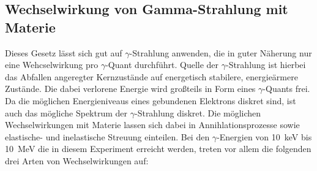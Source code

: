\subsection{Wechselwirkung von Gamma-Strahlung mit Materie}
Dieses Gesetz lässt sich gut auf $\gamma$-Strahlung anwenden, die in guter Näherung
nur eine Wehcselwirkung pro $\gamma$-Quant durchführt. Quelle der $\gamma$-Strahlung ist
hierbei das Abfallen angeregter Kernzustände auf energetisch stabilere, energieärmere
Zustände. Die dabei verlorene Energie wird großteils in Form eines $\gamma$-Quants frei.
Da die möglichen Energieniveaus eines gebundenen Elektrons diskret sind, ist auch das
mögliche Spektrum der $\gamma$-Strahlung diskret. Die möglichen Wechselwirkungen mit Materie
lassen sich dabei in Annihlationsprozesse sowie elastische- und inelastische Streuung
einteilen. Bei den $\gamma$-Energien von
\SI{10}{\kilo\electronvolt} bis \SI{10}{\mega\electronvolt} die in diesem Experiment
erreicht werden, treten vor allem die folgenden drei Arten von Wechselwirkungen auf:

